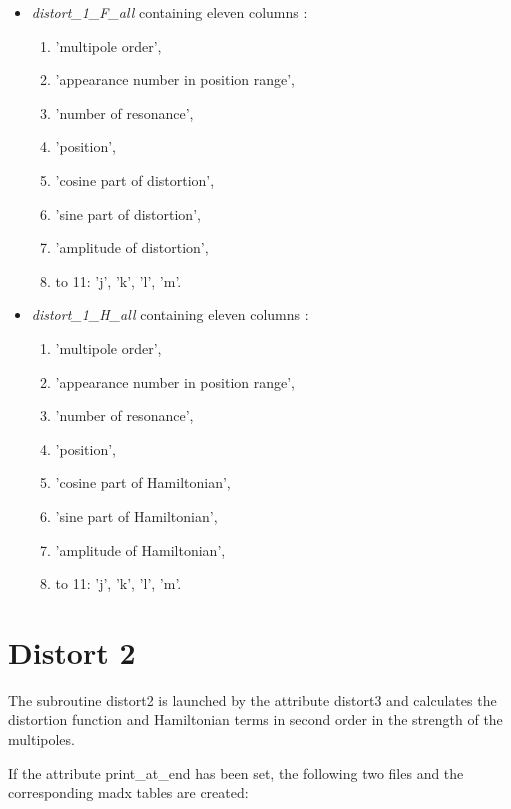 \begin{itemize} 
   \item \textit{distort\_1\_F\_all} containing eleven columns :  
     \begin{enumerate}
        \item 'multipole order', 
        \item 'appearance number in position range', 
        \item 'number of resonance', 
        \item 'position', 
        \item 'cosine part of distortion', 
        \item 'sine part of distortion', 
        \item 'amplitude of distortion', 
        \item to 11: 'j', 'k', 'l', 'm'. 
     \end{enumerate}
   \item \textit{distort\_1\_H\_all}  containing eleven columns : 
     \begin{enumerate}
        \item 'multipole order', 
        \item 'appearance number in position range', 
        \item 'number of resonance', 
        \item 'position', 
        \item 'cosine part of Hamiltonian', 
        \item 'sine part of Hamiltonian', 
        \item 'amplitude of Hamiltonian', 
        \item to 11: 'j', 'k', 'l', 'm'. 
     \end{enumerate}
\end{itemize}


\section{Distort 2}
The subroutine distort2 is launched by the attribute distort3 and
calculates the distortion function and Hamiltonian terms in second order
in the strength of the multipoles. 

If the attribute print\_at\_end has been set, the following two files
and the corresponding madx tables are created:  

